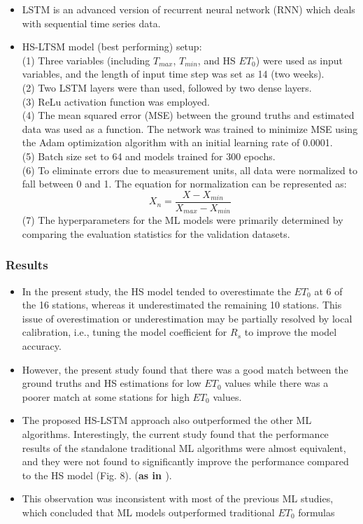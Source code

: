 \documentclass[paper=a4, fontsize=12pt]{scrartcl}
\begin{document}
\begin{itemize}
		\item LSTM is an advanced version of recurrent neural network (RNN) which deals with sequential time series data.
		\item HS-LTSM model (best performing) setup:\\
		(1) Three variables (including $T_{max}$, $T_{min}$, and HS $ET_0$) were used as input variables, and the length of input time step was set as 14 (two weeks). \\
		(2) Two LSTM layers were than used, followed by two dense layers. \\
		(3) ReLu activation function was employed. \\
		(4) The mean squared error (MSE) between the ground truths and estimated data was used as a function. The network was trained to minimize MSE using the Adam optimization algorithm with an initial learning rate of 0.0001.\\
		(5) Batch size set to 64 and models trained for 300 epochs. \\
		(6) To eliminate errors due to measurement units, all data were normalized to fall between 0 and 1. The equation for normalization can be represented as:\\
		\begin{equation}
			X_n = \frac{X - X_{min}}{X_{max} - X_{min}}
			\label{eqn:normal}
		\end{equation} 
		(7) The hyperparameters for the ML models were primarily determined by comparing the evaluation statistics for the validation datasets.
	\end{itemize}
	
	\subsubsection{Results}
	\begin{itemize}
		\item In the present study, the HS model tended to overestimate the $ET_0$ at 6 of the 16 stations, whereas it underestimated the remaining 10 stations. This issue of overestimation or underestimation may be partially resolved by local calibration, i.e., tuning the model coefficient for $R_s$ to improve the model accuracy.
		\item However, the present study found that there was a good match between the ground truths and HS estimations for low $ET_0$ values while there was a poorer match at some stations for high $ET_0$ values.
		\item The proposed HS-LSTM approach also outperformed the other ML algorithms.
		Interestingly, the current study found that the performance results of the standalone traditional ML algorithms were almost equivalent, and they were not found to significantly improve the performance compared to the HS model (Fig. 8). (\textbf{as in \cite{xu2018evaluating}}).
		\item This observation was inconsistent with  most of the previous ML studies, which concluded that ML models outperformed traditional $ET_0$ formulas
	\end{itemize}
	
\end{document}
